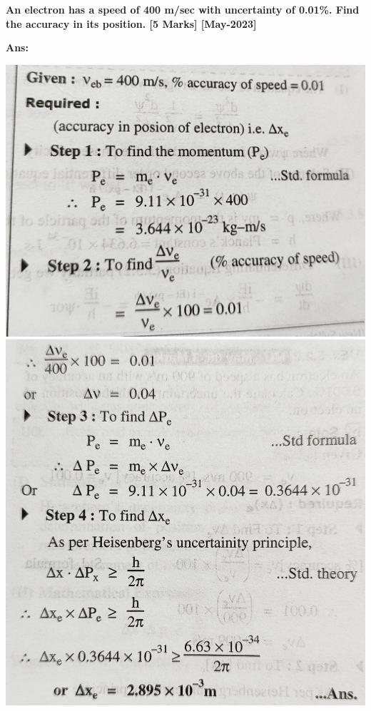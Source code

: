 \documentclass{exam}
\begin{document}
\begin{questions}
\question \textbf{ An electron has a speed of 400 m/sec with uncertainty of 0.01\%. Find the accuracy in its position. \hfil [5 Marks] [May-2023] }

\textbf{Ans:}
\begin{center}
	\includegraphics[scale=0.18]{Q10-1.jpeg}
	\includegraphics[scale=0.18]{Q10-2.jpeg}
\end{center}


\end{questions}
\end{document}

